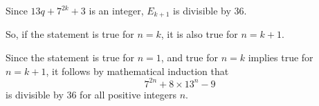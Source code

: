\documentclass[leqno]{article}
\begin{document}
\begin{enumerate}[
  label=\textbf{\arabic*.},
  leftmargin=*,
  topsep=0pt,
  partopsep=0pt,
  parsep=0pt
]
\begin{tcolorbox}[colback=white, colframe=scarlet, title={\textbf{Solution}}, breakable, grow to left by=6mm, grow to right by=10mm]
Since $13q+7^{2k}+3$ is an integer, $E_{k+1}$ is divisible by $36$.

So, if the statement is true for $n=k$, it is also true for $n=k+1$.

Since the statement is true for $n=1$, and true for $n=k$ implies true for $n=k+1$, it follows by mathematical induction that
\[
7^{2n}+8\times 13^n-9
\]
is divisible by $36$ for all positive integers $n$.
\end{tcolorbox}


\end{enumerate}
\end{document}
